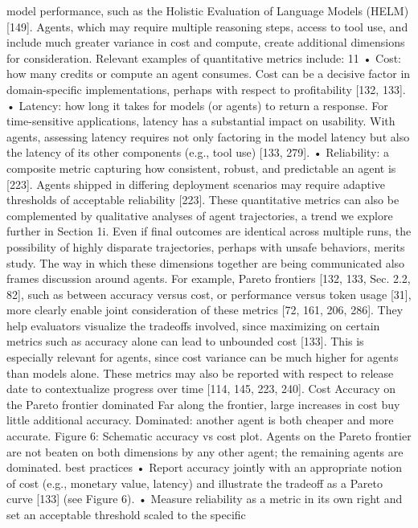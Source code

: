 model performance, such as the Holistic Evaluation of Language Models (HELM) [149]. Agents, which may
require multiple reasoning steps, access to tool use, and include much greater variance in cost and compute,
create additional dimensions for consideration. Relevant examples of quantitative metrics include:
11
• Cost: how many credits or compute an agent consumes. Cost can be a decisive factor in domain-specific
implementations, perhaps with respect to profitability [132, 133].
• Latency: how long it takes for models (or agents) to return a response. For time-sensitive applications,
latency has a substantial impact on usability. With agents, assessing latency requires not only factoring
in the model latency but also the latency of its other components (e.g., tool use) [133, 279].
• Reliability: a composite metric capturing how consistent, robust, and predictable an agent is [223].
Agents shipped in differing deployment scenarios may require adaptive thresholds of acceptable
reliability [223].
These quantitative metrics can also be complemented by qualitative analyses of agent trajectories, a trend
we explore further in Section 1i. Even if final outcomes are identical across multiple runs, the possibility of
highly disparate trajectories, perhaps with unsafe behaviors, merits study.
The way in which these dimensions together are being communicated also frames discussion around
agents. For example, Pareto frontiers [132, 133, Sec. 2.2, 82], such as between accuracy versus cost, or
performance versus token usage [31], more clearly enable joint consideration of these metrics [72, 161,
206, 286]. They help evaluators visualize the tradeoffs involved, since maximizing on certain metrics
such as accuracy alone can lead to unbounded cost [133]. This is especially relevant for agents, since cost
variance can be much higher for agents than models alone. These metrics may also be reported with respect
to release date to contextualize progress over time [114, 145, 223, 240].
Cost
Accuracy
on the Pareto frontier
dominated
Far along the frontier, large increases in
cost buy little additional accuracy.
Dominated: another agent is both
cheaper and more accurate.
Figure 6: Schematic accuracy vs cost plot. Agents on the Pareto frontier are not beaten on both dimensions by any
other agent; the remaining agents are dominated.
best practices
• Report accuracy jointly with an appropriate notion of cost (e.g., monetary value, latency) and illustrate the
tradeoff as a Pareto curve [133] (see Figure 6).
• Measure reliability as a metric in its own right and set an acceptable threshold scaled to the specific
